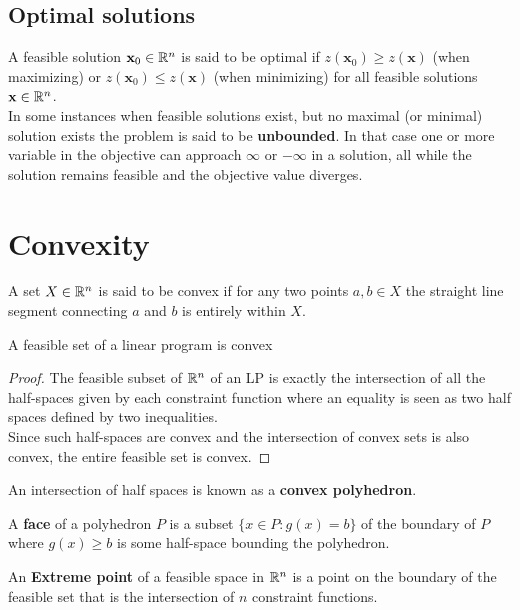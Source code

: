 \subsection{Optimal solutions}
A feasible solution $\textbf{x}_0 \in \mathbb{R}^n$ is said to be optimal if $z(\textbf{x}_0) \geq z(\textbf{x})$ (when maximizing) or $z(\textbf{x}_0) \leq z(\textbf{x})$ (when minimizing) for all feasible solutions $\textbf{x} \in \mathbb{R}^n$.\\
In some instances when feasible solutions exist, but no maximal (or minimal) solution exists the problem is said to be \textbf{unbounded}. In that case one or more variable in the objective can approach $\infty$ or $-\infty$ in a solution, all while the solution remains feasible and the objective value diverges.
\section{Convexity}
\begin{definition}\label{convex}
A set $X \in \mathbb{R}^n$ is said to be convex if for any two points $a, b \in X$ the straight line segment 
connecting $a$ and $b$ is entirely within $X$.
\end{definition}
\begin{theorem}
A feasible set of a linear program is convex
\begin{proof}
The feasible subset of $\mathbb{R}^n$ of an LP is exactly the intersection of all the half-spaces given by each constraint function where an equality is seen as two half spaces defined by two inequalities. \\
Since such half-spaces are convex and the intersection of convex sets is also convex, the entire feasible set is convex.
\end{proof}
\end{theorem}
\begin{definition}
An intersection of half spaces is known as a \textbf{convex polyhedron}. 
\end{definition}
\begin{definition}
A \textbf{face} of a polyhedron $P$ is a subset $\{x\in P:g(x)=b\}$ of the boundary of $P$ where $g(x) \geq b$ is some half-space bounding the polyhedron. 
\end{definition}
\begin{definition}
An \textbf{Extreme point} of a feasible space in $\mathbb{R}^n$ is a point on the boundary of the feasible set that is the intersection of $n$ constraint functions.
\end{definition}
